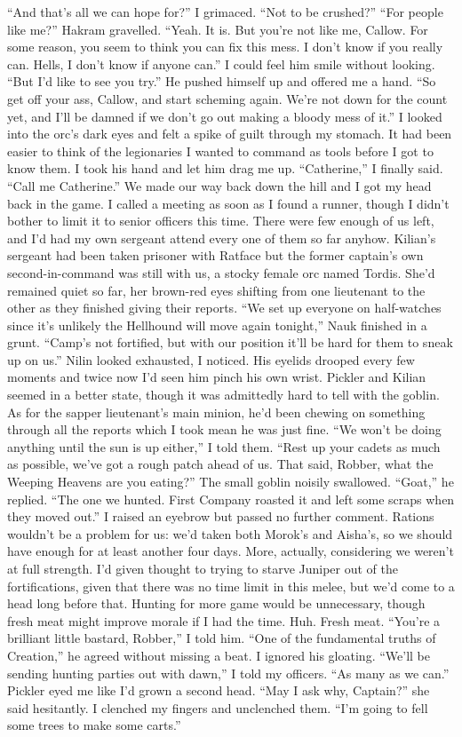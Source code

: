 \documentclass[12pt, openany]{book}
\begin{document}
“And that’s all we can hope for?” I grimaced. “Not to be crushed?”
“For people like me?” Hakram gravelled. “Yeah. It is. But you’re not like me, Callow. For some reason, you seem to think you can fix this mess. I don’t know if you really can. Hells, I don’t know if anyone can.” I could feel him smile without looking. “But I’d like to see you try.”
He pushed himself up and offered me a hand.
“So get off your ass, Callow, and start scheming again. We’re not down for the count yet, and I’ll be damned if we don’t go out making a bloody mess of it.”
I looked into the orc’s dark eyes and felt a spike of guilt through my stomach. It had been easier to think of the legionaries I wanted to command as tools before I got to know them. I took his hand and let him drag me up.
“Catherine,” I finally said. “Call me Catherine.”
We made our way back down the hill and I got my head back in the game. I called a meeting as soon as I found a runner, though I didn’t bother to limit it to senior officers this time. There were few enough of us left, and I’d had my own sergeant attend every one of them so far anyhow. Kilian’s sergeant had been taken prisoner with Ratface but the former captain’s own second-in-command was still with us, a stocky female orc named Tordis. She’d remained quiet so far, her brown-red eyes shifting from one lieutenant to the other as they finished giving their reports.
“We set up everyone on half-watches since it’s unlikely the Hellhound will move again tonight,” Nauk finished in a grunt. “Camp’s not fortified, but with our position it’ll be hard for them to sneak up on us.”
Nilin looked exhausted, I noticed. His eyelids drooped every few moments and twice now I’d seen him pinch his own wrist. Pickler and Kilian seemed in a better state, though it was admittedly hard to tell with the goblin. As for the sapper lieutenant’s main minion, he’d been chewing on something through all the reports which I took mean he was just fine.
“We won’t be doing anything until the sun is up either,” I told them. “Rest up your cadets as much as possible, we’ve got a rough patch ahead of us. That said, Robber, what the Weeping Heavens are you eating?”
The small goblin noisily swallowed.
“Goat,” he replied. “The one we hunted. First Company roasted it and left some scraps when they moved out.”
I raised an eyebrow but passed no further comment. Rations wouldn’t be a problem for us: we’d taken both Morok’s and Aisha’s, so we should have enough for at least another four days. More, actually, considering we weren’t at full strength. I’d given thought to trying to starve Juniper out of the fortifications, given that there was no time limit in this melee, but we’d come to a head long before that. Hunting for more game would be unnecessary, though fresh meat might improve morale if I had the time. Huh. Fresh meat.
“You’re a brilliant little bastard, Robber,” I told him.
“One of the fundamental truths of Creation,” he agreed without missing a beat.
I ignored his gloating. “We’ll be sending hunting parties out with dawn,” I told my officers. “As many as we can.”
Pickler eyed me like I’d grown a second head.
“May I ask why, Captain?” she said hesitantly.
I clenched my fingers and unclenched them. “I’m going to fell some trees to make some carts.”
\end{document}

